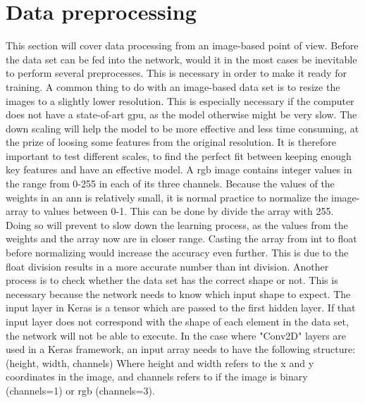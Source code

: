 \documentclass[USenglish]{ifimaster}  %
\begin{document}
\section{Data preprocessing}
This section will cover data processing from an image-based point of view. Before the data set can be fed into the network, would it in the most cases be inevitable to perform several preprocesses. This is necessary in order to make it ready for training. 
\newline
A common thing to do with an image-based data set is to resize the images to a slightly lower resolution. This is especially necessary if the computer does not have a state-of-art \ac{gpu}, as the model otherwise might be very slow. The down scaling will help the model to be more effective and less time consuming, at the prize of loosing some features from the original resolution. It is therefore important to test different scales, to find the perfect fit between keeping enough key features and have an effective model.
\newline
A \ac{rgb} image contains integer values in the range from 0-255 in each of its three channels. Because the values of the weights in an \ac{ann} is relatively small, it is normal practice to normalize the image-array to values between 0-1. This can be done by divide the array with 255. Doing so will prevent to slow down the learning process, as the values from the weights and the array now are in closer range. Casting the array from int to float before normalizing would increase the accuracy even further. This is due to the float division results in a more accurate number than int division. 
\newline
\newline
Another process is to check whether the data set has the correct shape or not. This is necessary because the network needs to know which input shape to expect. The input layer in Keras is a tensor which are passed to the first hidden layer. If that input layer does not correspond with the shape of each element in the data set, the network will not be able to execute. In the case where "Conv2D" layers are used in a Keras framework, an input array needs to have the following structure:
\newline
\newline
(height, width, channels)
\newline
\newline
Where height and width refers to the x and y coordinates in the image, and channels refers to if the image is binary (channels=1) or \ac{rgb} (channels=3).
\end{document}
